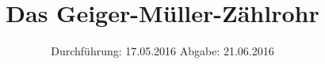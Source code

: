 

\subject{V703  Korrektur}
\title{Das Geiger-Müller-Zählrohr}
\date{
  Durchführung: 17.05.2016
  \hspace{3em}
  Abgabe: 21.06.2016
}



\maketitle
\thispagestyle{empty}
\tableofcontents
\newpage







\printbibliography


